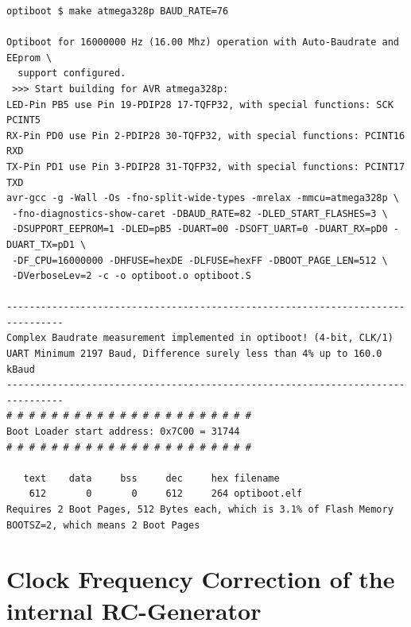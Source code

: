 \begin{verbatim}
optiboot $ make atmega328p BAUD_RATE=76

Optiboot for 16000000 Hz (16.00 Mhz) operation with Auto-Baudrate and EEprom \
  support configured.
 >>> Start building for AVR atmega328p:
LED-Pin PB5 use Pin 19-PDIP28 17-TQFP32, with special functions: SCK PCINT5
RX-Pin PD0 use Pin 2-PDIP28 30-TQFP32, with special functions: PCINT16 RXD
TX-Pin PD1 use Pin 3-PDIP28 31-TQFP32, with special functions: PCINT17 TXD
avr-gcc -g -Wall -Os -fno-split-wide-types -mrelax -mmcu=atmega328p \
 -fno-diagnostics-show-caret -DBAUD_RATE=82 -DLED_START_FLASHES=3 \
 -DSUPPORT_EEPROM=1 -DLED=pB5 -DUART=00 -DSOFT_UART=0 -DUART_RX=pD0 -DUART_TX=pD1 \
 -DF_CPU=16000000 -DHFUSE=hexDE -DLFUSE=hexFF -DBOOT_PAGE_LEN=512 \
 -DVerboseLev=2 -c -o optiboot.o optiboot.S

--------------------------------------------------------------------------------
Complex Baudrate measurement implemented in optiboot! (4-bit, CLK/1)
UART Minimum 2197 Baud, Difference surely less than 4% up to 160.0 kBaud
--------------------------------------------------------------------------------
# # # # # # # # # # # # # # # # # # # # # #
Boot Loader start address: 0x7C00 = 31744
# # # # # # # # # # # # # # # # # # # # # #

   text    data     bss     dec     hex filename
    612       0       0     612     264 optiboot.elf
Requires 2 Boot Pages, 512 Bytes each, which is 3.1% of Flash Memory
BOOTSZ=2, which means 2 Boot Pages

\end{verbatim}


\section{Clock Frequency Correction of the internal RC-Generator}

